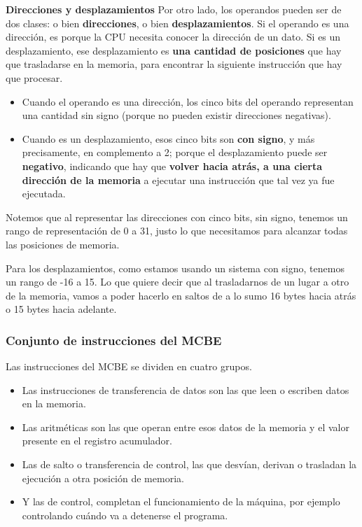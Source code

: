 \documentclass[spanish,a4paper,]{article}
\providecommand{\tightlist}{%
  \setlength{\itemsep}{0pt}\setlength{\parskip}{0pt}}
\begin{document}
\textbf{Direcciones y desplazamientos} Por otro lado, los operandos
pueden ser de dos clases: o bien \textbf{direcciones}, o bien
\textbf{desplazamientos}. Si el operando es una dirección, es porque la
CPU necesita conocer la dirección de un dato. Si es un desplazamiento,
ese desplazamiento es \textbf{una cantidad de posiciones} que hay que
trasladarse en la memoria, para encontrar la siguiente instrucción que
hay que procesar.

\begin{itemize}
\tightlist
\item
  Cuando el operando es una dirección, los cinco bits del operando
  representan una cantidad sin signo (porque no pueden existir
  direcciones negativas).
\item
  Cuando es un desplazamiento, esos cinco bits son \textbf{con signo}, y
  más precisamente, en complemento a 2; porque el desplazamiento puede
  ser \textbf{negativo}, indicando que hay que \textbf{volver hacia
  atrás, a una cierta dirección de la memoria} a ejecutar una
  instrucción que tal vez ya fue ejecutada.
\end{itemize}

Notemos que al representar las direcciones con cinco bits, sin signo,
tenemos un rango de representación de 0 a 31, justo lo que necesitamos
para alcanzar todas las posiciones de memoria.

Para los desplazamientos, como estamos usando un sistema con signo,
tenemos un rango de -16 a 15. Lo que quiere decir que al trasladarnos de
un lugar a otro de la memoria, vamos a poder hacerlo en saltos de a lo
sumo 16 bytes hacia atrás o 15 bytes hacia adelante.

\hypertarget{conjunto-de-instrucciones-del-mcbe}{%
\subsubsection{Conjunto de instrucciones del
MCBE}\label{conjunto-de-instrucciones-del-mcbe}}

Las instrucciones del MCBE se dividen en cuatro grupos.

\begin{itemize}
\tightlist
\item
  Las instrucciones de transferencia de datos son las que leen o
  escriben datos en la memoria.\\
\item
  Las aritméticas son las que operan entre esos datos de la memoria y el
  valor presente en el registro acumulador.\\
\item
  Las de salto o transferencia de control, las que desvían, derivan o
  trasladan la ejecución a otra posición de memoria.\\
\item
  Y las de control, completan el funcionamiento de la máquina, por
  ejemplo controlando cuándo va a detenerse el programa.
\end{itemize}
\end{document}
